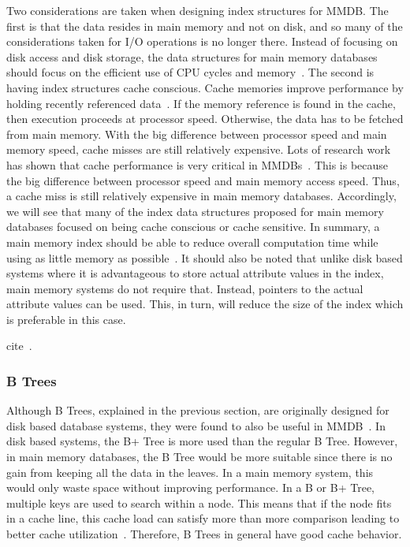 \documentclass[12pt,a4paper]{article}
\begin{document}
Two considerations are taken when designing index structures for MMDB. The first is that the data resides in main memory and not on disk, and so many of the
considerations taken for I/O operations is no longer there. Instead of focusing on disk access and disk storage, the data structures for main memory
databases should focus on the efficient use of CPU cycles and memory~\cite{lehman1986study}. The second is having index structures cache conscious. Cache
memories improve performance by holding recently referenced data~\cite{smith1982cache}. If the memory reference is found in the cache, then execution proceeds
at processor speed. Otherwise, the data has to be fetched from main memory. With the big difference between processor speed and main memory speed, cache misses
are still relatively expensive. Lots of research work has shown that cache performance is very critical in MMDBs~\cite{boncz1999database,rao1999cache}. This is
because the big difference between processor speed and main memory access speed. Thus, a cache miss is still relatively expensive in main memory databases.
Accordingly, we will see that many of the index data structures proposed for main memory databases focused on being cache conscious or cache sensitive. In
summary, a main memory index should be able to reduce overall computation time while using as little memory as possible~\cite{lehman1986study}. It should also
be noted that unlike disk based systems where it is advantageous to store actual attribute values in the index, main memory systems do not require that.
Instead, pointers to the actual attribute values can be used. This, in turn, will reduce the size of the index which is preferable in this case.

cite~\cite{dewitt1984implementation}.

\subsubsection*{B Trees}
Although B Trees, explained in the previous section, are originally designed for disk based database systems, they were found to also be useful in
MMDB~\cite{lehman1986study}. In disk based systems, the B+ Tree is more used than the regular B Tree. However, in main memory databases, the B Tree would be
more suitable since there is no gain from keeping all the data in the leaves. In a main memory system, this would only waste space without improving
performance. In a B or B+ Tree, multiple keys are used to search within a node. This means that if the node fits in a cache line, this cache load can satisfy
more than more comparison leading to better cache utilization~\cite{rao1999cache}. Therefore, B Trees in general have good cache behavior.
\end{document}
